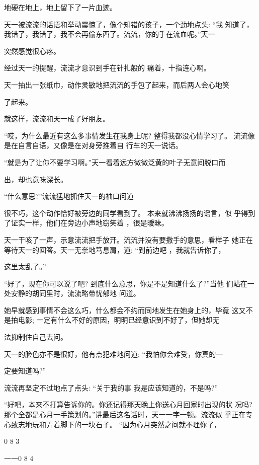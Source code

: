 \documentclass{article}
\begin{document}
地硬在地上，地上留下了一片血迹。 

天一被流流的话语和举动震惊了，像个知错的孩子，一个劲地点头: “我
知道了，我错了，我错了，我不会再偷东西了。流流，你的手在流血呢。”天一

突然感觉很心疼。 

\newpage

经过天一的提醒，流流才意识到手在针扎般的
痛着，十指连心啊。 

天一抽出一张纸巾，动作灵敏地把流流的手包了起来，而后两人会心地笑

了起来。 


就这样，流流和天一成了好朋友。 

“哎，为什么最近有这么多事情发生在我身上呢? 整得我都没心情学习了。
流流像是在自言自语，又像是在对身旁推着自
行车的天一说话。 

“就是为了让你不要学习啊。”天一看着远方微微泛黄的叶子无意间脱口而

出，却也意味深长。 

“什么意思?”流流猛地抓住天一的袖口问道

很不巧，这个动作恰好被旁边的同学看到了。
\newpage
本来就沸沸扬扬的谣言，似
乎得到了证实一样，他们在旁边小声地窃笑着
，很是暧昧。 

天一干咳了一声，示意流流把手放开。流流并没有要撒手的意思，看样子
她正在等待天一的回答。天一无奈地笃息肩，道: “到前边吧 ，我就告诉你了，

这里太乱了。” 

“好了，现在你可以说了吧? 到底什么意思，你是不是知道什么了?”当他
们站在一处安静的胡同里时，流流略带忧郁地
问道。 

她早就感到事情不会这么巧，什么都会不约而同地发生在她身上的，毕竟
这又不是拍电影; 一定有什么不好的原因，明明已经意识到不好了，但她却无

法抑制住自己去问。 

\newpage

天一的脸色亦不是很好，他有点犯难地问道: “我怕你会难受，你真的一

定要知道吗?” 

流流再坚定不过地点了点头: “关于我的事
我是应该知道的，不是吗?” 

“好吧，本来不打算告诉你的。你还记得那天晚上你送心月回家时出现的状
况吗? 那个全都是心月一手策划的。”讲最后这名话时，天一一字一顿。流流似
乎正在专心致志地玩和弄着脚下的一块石子。
“因为心月突然之间就不理你了， 


0 8 3 



一一0 8 4 
\end{document}
